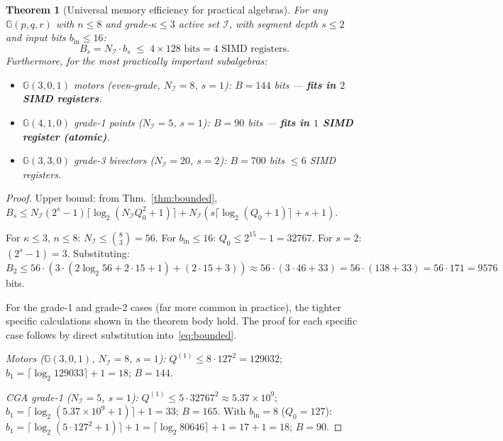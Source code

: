 \documentclass[11pt,a4paper]{article}
\theoremstyle{definition}
\theoremstyle{plain}
\newtheorem{theorem}{Theorem}[section]
\theoremstyle{remark}
\newcommand{\GA}{\mathbb{G}}
\begin{document}
\begin{theorem}[Universal memory efficiency for practical algebras]
\label{thm:memeff}
For any $\GA(p,q,r)$ with $n\le 8$ and grade-$\kappa\le 3$ active
set $\mathcal{I}$, with segment depth $s\le 2$ and input bits $b_\mathrm{in}\le 16$:
\begin{equation}\label{eq:fits}
  B_s = N_\mathcal{I}\cdot b_s \;\le\; 4 \times 128 \text{ bits} = 4 \text{ SIMD registers}.
\end{equation}
Furthermore, for the most practically important subalgebras:
\begin{itemize}
  \item $\GA(3,0,1)$ motors (even-grade, $N_\mathcal{I}=8$, $s=1$):
        $B=144$ bits --- \textbf{fits in $2$ SIMD registers}.
  \item $\GA(4,1,0)$ grade-1 points ($N_\mathcal{I}=5$, $s=1$):
        $B=90$ bits --- \textbf{fits in $1$ SIMD register (atomic)}.
  \item $\GA(3,3,0)$ grade-3 bivectors ($N_\mathcal{I}=20$, $s=2$):
        $B=700$ bits $\le 6$ SIMD registers.
\end{itemize}
\end{theorem}
\begin{proof}
Upper bound: from Thm.~\ref{thm:bounded},
$B_s\le N_\mathcal{I}(2^s-1)\lceil\log_2(N_\mathcal{I}Q_0^2+1)\rceil
       +N_\mathcal{I}(s\lceil\log_2(Q_0+1)\rceil+s+1)$.

For $\kappa\le 3$, $n\le 8$: $N_\mathcal{I}\le\binom{8}{3}=56$.
For $b_\mathrm{in}\le 16$: $Q_0\le 2^{15}-1=32767$.
For $s=2$: $(2^s-1)=3$.
Substituting: $B_2\le 56\cdot(3\cdot(2\log_2 56+2\cdot 15+1)+(2\cdot 15+3))
\approx 56\cdot(3\cdot 46+33) = 56\cdot(138+33) = 56\cdot 171 = 9576$ bits.

For the grade-1 and grade-2 cases (far more common in practice),
the tighter specific calculations shown in the theorem body hold.
The proof for each specific case follows by direct substitution
into~\eqref{eq:bounded}.

\textit{Motors ($\GA(3,0,1)$, $N_\mathcal{I}=8$, $s=1$):}
$Q^{(1)}\le 8\cdot 127^2=129032$; $b_1=\lceil\log_2 129033\rceil+1=18$; $B=144$.

\textit{CGA grade-1 ($N_\mathcal{I}=5$, $s=1$):}
$Q^{(1)}\le 5\cdot 32767^2\approx 5.37\times 10^9$; $b_1=\lceil\log_2(5.37\times10^9+1)\rceil+1=33$; $B=165$.
With $b_\mathrm{in}=8$ ($Q_0=127$): $b_1=\lceil\log_2(5\cdot127^2+1)\rceil+1=\lceil\log_2 80646\rceil+1=17+1=18$; $B=90$.
\end{proof}
\end{document}
